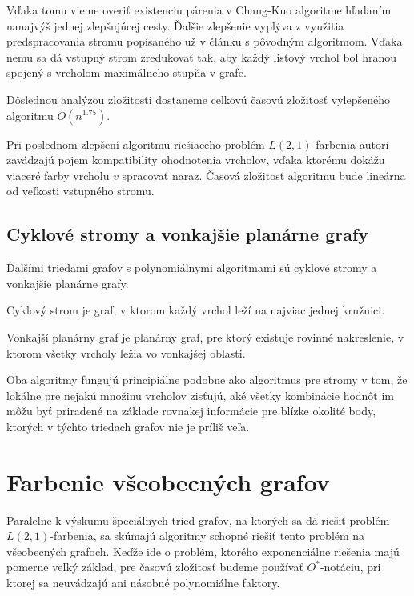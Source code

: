 Vďaka tomu vieme overiť existenciu párenia v Chang-Kuo algoritme hľadaním nanajvýš
jednej zlepšujúcej cesty. Ďalšie zlepšenie vyplýva z využitia predspracovania stromu popísaného
už v článku s pôvodným algoritmom. Vďaka nemu sa dá vstupný strom zredukovať tak, aby každý
listový vrchol bol hranou spojený s vrcholom maximálneho stupňa v grafe\cite{chang_kuo}.

Dôslednou analýzou 
zložitosti dostaneme celkovú časovú zložitosť vylepšeného algoritmu $O(n^{1.75})$\cite{chang_kuo_improv}.

Pri poslednom zlepšení algoritmu riešiaceho problém $L(2,1)$-farbenia autori zavádzajú
pojem kompatibility ohodnotenia vrcholov, vďaka ktorému dokážu viaceré farby vrcholu $v$
spracovať naraz. Časová zložitosť algoritmu bude lineárna od veľkosti vstupného stromu\cite{chang_kuo_linear}.

\subsection{Cyklové stromy a vonkajšie planárne grafy}

Ďalšími triedami grafov s polynomiálnymi algoritmami sú cyklové stromy\cite{kaktusy} a vonkajšie
planárne grafy\cite{outer_planar}.

\begin{defn}
    Cyklový strom je graf, v ktorom každý vrchol leží na najviac jednej kružnici.
\end{defn}

\begin{defn}
    Vonkajší planárny graf je planárny graf, pre ktorý existuje rovinné nakreslenie, v ktorom
    všetky vrcholy ležia vo vonkajšej oblasti.
\end{defn}

Oba algoritmy fungujú principiálne podobne ako algoritmus pre stromy v tom, že lokálne pre
nejakú množinu vrcholov zisťujú, aké všetky kombinácie hodnôt im môžu byť priradené na
základe rovnakej informácie pre blízke okolité body, ktorých v týchto triedach grafov nie je
príliš veľa.

\section{Farbenie všeobecných grafov}

Paralelne k výskumu špeciálnych tried grafov, na ktorých sa dá riešiť problém $L(2,1)$-farbenia,
sa skúmajú algoritmy schopné riešiť tento problém na všeobecných grafoch. Keďže ide o problém,
ktorého exponenciálne riešenia majú pomerne veľký základ, pre časovú zložitosť budeme používať
$O^*$-notáciu, pri ktorej sa neuvádzajú ani násobné polynomiálne faktory.

